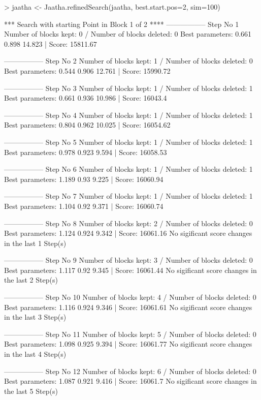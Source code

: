 
\begin{Schunk}
\begin{Sinput}
> jaatha <- Jaatha.refinedSearch(jaatha, best.start.pos=2, sim=100)
\end{Sinput}
\begin{Soutput}
*** Search with starting Point in Block 1 of 2 **** 
----------------- 
Step No 1 
Number of blocks kept: 0  / Number of blocks deleted: 0 
Best parameters:  0.661 0.898 14.823 | Score: 15811.67 

----------------- 
Step No 2 
Number of blocks kept: 1  / Number of blocks deleted: 0 
Best parameters:  0.544 0.906 12.761 | Score: 15990.72 

----------------- 
Step No 3 
Number of blocks kept: 1  / Number of blocks deleted: 1 
Best parameters:  0.661 0.936 10.986 | Score: 16043.4 

----------------- 
Step No 4 
Number of blocks kept: 1  / Number of blocks deleted: 1 
Best parameters:  0.804 0.962 10.025 | Score: 16054.62 

----------------- 
Step No 5 
Number of blocks kept: 1  / Number of blocks deleted: 1 
Best parameters:  0.978 0.923 9.594 | Score: 16058.53 

----------------- 
Step No 6 
Number of blocks kept: 1  / Number of blocks deleted: 1 
Best parameters:  1.189 0.93 9.225 | Score: 16060.94 

----------------- 
Step No 7 
Number of blocks kept: 1  / Number of blocks deleted: 1 
Best parameters:  1.104 0.92 9.371 | Score: 16060.74 

----------------- 
Step No 8 
Number of blocks kept: 2  / Number of blocks deleted: 0 
Best parameters:  1.124 0.924 9.342 | Score: 16061.16 
No sigificant score changes in the last 1 Step(s) 

----------------- 
Step No 9 
Number of blocks kept: 3  / Number of blocks deleted: 0 
Best parameters:  1.117 0.92 9.345 | Score: 16061.44 
No sigificant score changes in the last 2 Step(s) 

----------------- 
Step No 10 
Number of blocks kept: 4  / Number of blocks deleted: 0 
Best parameters:  1.116 0.924 9.346 | Score: 16061.61 
No sigificant score changes in the last 3 Step(s) 

----------------- 
Step No 11 
Number of blocks kept: 5  / Number of blocks deleted: 0 
Best parameters:  1.098 0.925 9.394 | Score: 16061.77 
No sigificant score changes in the last 4 Step(s) 

----------------- 
Step No 12 
Number of blocks kept: 6  / Number of blocks deleted: 0 
Best parameters:  1.087 0.921 9.416 | Score: 16061.7 
No sigificant score changes in the last 5 Step(s) 


\end{Soutput}
\end{Schunk}
